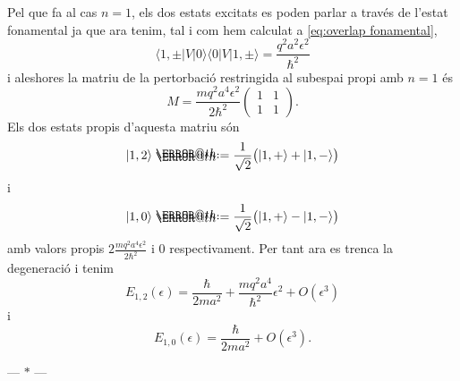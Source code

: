 \documentclass[12pt]{article}
\makeatletter
\numberwithin{table}{section}
\numberwithin{figure}{section}
\newcommand{\ket}[1]{\vert {#1} \rangle}
\newcommand{\bra}[1]{\langle #1 \vert}
\newcommand{\parbreak}{
	\begin{center}
		--- $\ast$ ---
	\end{center} 
}
\newcommand*{\defeq}{\mathrel{\rlap{%
    \raisebox{0.3ex}{$\m@th\cdot$}}%
  \raisebox{-0.3ex}{$\m@th\cdot$}}%
	=
}
\makeatother
\begin{document}
Pel que fa al cas \( n = 1 \), els dos estats excitats es poden parlar a través de l'estat fonamental ja que ara tenim, tal i com hem calculat a \cref{eq:overlap fonamental},
\begin{equation*}
	\bra{1,\pm}V\ket{0}\bra{0}V\ket{1,\pm} = \frac{q^2a^2\epsilon^2}{\hbar^2}
\end{equation*}
i aleshores la matriu de la pertorbació restringida al subespai propi amb \( n = 1 \) és
\begin{equation*}
	M = \frac{mq^2a^4\epsilon^2}{2\hbar^2}\begin{pmatrix}
		1 & 1 \\ 1 & 1
	\end{pmatrix}.
\end{equation*}
Els dos estats propis d'aquesta matriu són 
\begin{equation*}
	\ket{1,2} \defeq \frac{1}{\sqrt{2}}\big(\ket{1,+} + \ket{1,-}\big)
\end{equation*} i
\begin{equation*}
	\ket{1,0} \defeq \frac{1}{\sqrt{2}}\big(\ket{1,+} - \ket{1,-}\big) 
\end{equation*}
amb valors propis \( 2\frac{mq^2a^4\epsilon^2}{2\hbar^2} \) i 0 respectivament. Per tant ara es trenca la degeneració i tenim
\begin{equation*}
	E_{1,2}(\epsilon) = \frac{\hbar}{2ma^2} + \frac{mq^2a^4}{\hbar^2}\epsilon^2 + O(\epsilon^3)
\end{equation*}
i
\begin{equation*}
	E_{1,0}(\epsilon) = \frac{\hbar}{2ma^2} + O(\epsilon^3).
\end{equation*}

\parbreak
\end{document}
